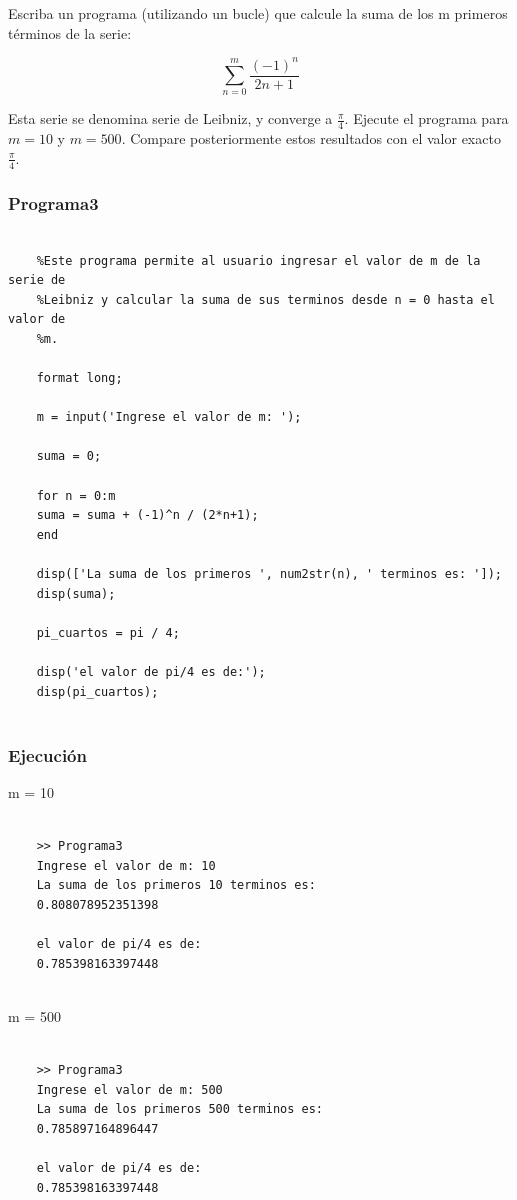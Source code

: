 \documentclass{article}
\begin{document}
	Escriba un programa (utilizando un bucle) que calcule la suma de los m primeros términos de la serie:
	
	$$\sum_{n=0}^m \frac{(-1)^n}{2n+1}$$
	
	Esta serie se denomina serie de Leibniz, y converge a $\frac{\pi}{4}$. Ejecute el programa para $m = 10$ y $m = 500$. Compare posteriormente estos resultados con el valor exacto $\frac{\pi}{4}$.
	
	\subsubsection{Programa3}
	
	\begin{lstlisting}
	
	%Este programa permite al usuario ingresar el valor de m de la serie de
	%Leibniz y calcular la suma de sus terminos desde n = 0 hasta el valor de
	%m.
	
	format long;
	
	m = input('Ingrese el valor de m: ');
	
	suma = 0;
	
	for n = 0:m
	suma = suma + (-1)^n / (2*n+1);
	end
	
	disp(['La suma de los primeros ', num2str(n), ' terminos es: ']);
	disp(suma);
	
	pi_cuartos = pi / 4;
	
	disp('el valor de pi/4 es de:');
	disp(pi_cuartos);
	
	\end{lstlisting}
	
	\subsubsection{Ejecución}
	
	m = 10\\
	
	\begin{lstlisting}
	
	>> Programa3
	Ingrese el valor de m: 10
	La suma de los primeros 10 terminos es: 
	0.808078952351398
	
	el valor de pi/4 es de:
	0.785398163397448
	
	\end{lstlisting}
	
	m = 500\\
	
	\begin{lstlisting}
	
	>> Programa3
	Ingrese el valor de m: 500
	La suma de los primeros 500 terminos es: 
	0.785897164896447
	
	el valor de pi/4 es de:
	0.785398163397448
	
	\end{lstlisting}
	\newpage
	
\end{document}
